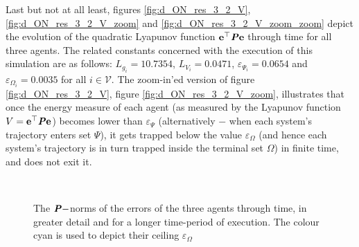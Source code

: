 Last but not at all least, figures
\eqref{fig:d_ON_res_3_2_V}, \eqref{fig:d_ON_res_3_2_V_zoom} and
\eqref{fig:d_ON_res_3_2_V_zoom_zoom} depict
the evolution of the quadratic Lyapunov function
$\bm{\mathbf{e}}^{\top} \bm{\mathit{P}} \bm{\mathbf{e}}$ through time for all three agents.
The related constants concerned with the execution
of this simulation are as follows: $L_{g_i} = 10.7354$, $L_{V_i} = 0.0471$,
$\varepsilon_{\Psi_i} = 0.0654$ and $\varepsilon_{\Omega_i} = 0.0035$ for
all $i \in \mathcal{V}$. The zoom-in'ed version of figure
\eqref{fig:d_ON_res_3_2_V}, figure \eqref{fig:d_ON_res_3_2_V_zoom},
illustrates that once the energy measure of each agent (as measured by
the Lyapunov function $V = \bm{\mathbf{e}}^{\top} \bm{\mathit{P}} \bm{\mathbf{e}}$) becomes lower than
$\varepsilon_{\Psi}$ (alternatively $-$ when each system's trajectory enters
set $\Psi$), it gets trapped below the value $\varepsilon_{\Omega}$ (and
hence each system's trajectory is in turn trapped inside the terminal
set $\Omega$) in finite time, and does not exit it.


\noindent{}\\[2.5ex]

\begin{figure}[H]\centering
  \scalebox{0.7}{}
  \caption{The $\bm{\mathit{P}}-$norms of the errors of the three agents through time,
    in greater detail and for a longer time-period of execution. The colour
    cyan is used to depict their ceiling $\varepsilon_{\Omega}$}
  \label{fig:d_ON_res_3_2_V_zoom_zoom}
\end{figure}

